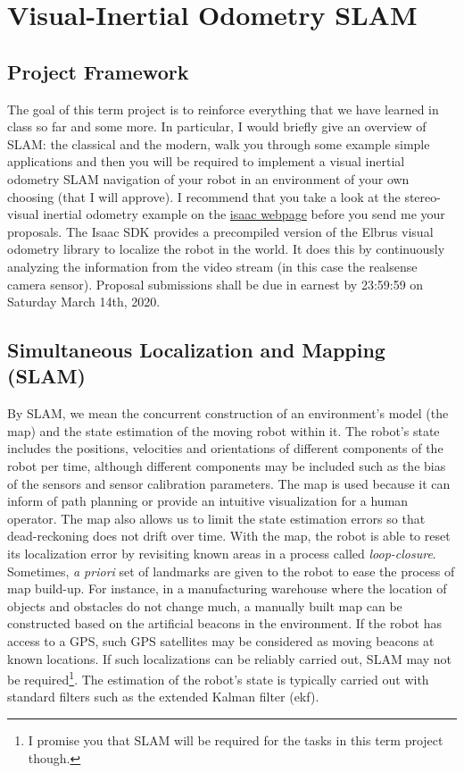 
\chapter{Visual-Inertial Odometry SLAM}

\section{Project Framework}
The goal of this term project is to reinforce everything that we have learned	 in class so far and some more. In particular, I would briefly give an overview of SLAM: the classical and the modern, walk you through some example simple applications and then you will be required to implement a visual inertial odometry SLAM navigation of your robot in an environment of your own choosing (that I will approve). I recommend that you take a look at the stereo-visual inertial odometry example on the \href{https://docs.nvidia.com/isaac/isaac/packages/perception/doc/visual_odometry.html}{isaac webpage} before you send me your proposals.  The Isaac SDK provides a precompiled version of the Elbrus visual odometry library to localize the robot in the world. It does this by continuously analyzing the information from the video stream (in this case the realsense camera sensor). Proposal submissions shall be due in earnest by 23:59:59 on Saturday March 14th, 2020.

\section{Simultaneous Localization and Mapping (SLAM)}

By SLAM, we mean the concurrent construction of an environment's model (the map) and the state estimation of the moving robot within it. The robot's state includes the positions, velocities and orientations of different components of the robot per time, although different components may be included such as the bias of the sensors and sensor calibration parameters. The map is used because it can inform of path planning or provide an intuitive visualization for a human operator. The map also allows us to limit the state estimation errors so that dead-reckoning does not drift over time. With the map, the robot is able to reset its localization error by revisiting known areas in a process called \textit{loop-closure}. Sometimes, \textit{a priori} set of landmarks are given to the robot to ease the process of map build-up. For instance, in a manufacturing warehouse where the location of objects and obstacles do not change much, a manually built map can be constructed based on the artificial beacons in the environment. If the robot has access to a GPS, such GPS satellites may be considered as moving beacons at known locations. If such localizations can be reliably carried out, SLAM may not be required\footnote{I promise you that SLAM will be required for the tasks in this term project though.}.  The estimation of the robot's  state  is typically carried out with standard filters such as the extended Kalman filter (ekf).  

